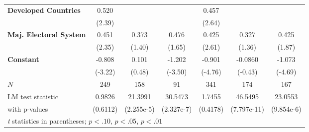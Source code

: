 \begin{table}
\begin{adjustbox}{width=1\textwidth}
\begin{tabular}{l*{6}{c}}
\textbf{Developed Countries}     &       0.520\sym{**} &                     &                     &       0.457\sym{***}&                     &                     \\
            &      (2.39)         &                     &                     &      (2.64)         &                     &                     \\


\textbf{Maj. Electoral System}    &       0.451\sym{**} &       0.373         &       0.476\sym{*}  &       0.425\sym{***}&       0.327         &       0.425\sym{*}  \\
            &      (2.35)         &      (1.40)         &      (1.65)         &      (2.61)         &      (1.36)         &      (1.87)         \\

\textbf{Constant}      &      -0.808\sym{***}&       0.101         &      -1.202\sym{***}&      -0.901\sym{***}&     -0.0860         &      -1.073\sym{***}\\
            &     (-3.22)         &      (0.48)         &     (-3.50)         &     (-4.76)         &     (-0.43)         &     (-4.69)         \\
\hline
\(N\)       &         249         &         158         &          91         &         341         &         174         &         167         \\
 LM test statistic & 0.9826               & 21.3991             & 30.5473               & 1.7455               & 46.5495             & 23.0553               \\
 with p-values & (0.6112) & (2.255e-5)          & (2.327e-7) & (0.4178) & (7.797e-11)         & (9.854e-6) \\
 \hline\hline
\multicolumn{7}{l}{\footnotesize \textit{t} statistics in parentheses; \sym{*} \(p<.10\), \sym{**} \(p<.05\), \sym{***} \(p<.01\)
}\\
\end{tabular}
\end{adjustbox}

\end{table}
